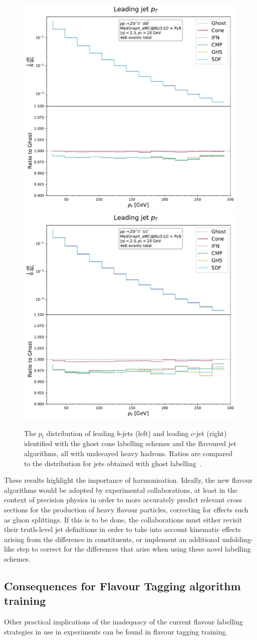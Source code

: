 \documentclass[10pt,a4paper]{book}
\begin{document}
\begin{figure}
    \centering
    \includegraphics[width=0.485\linewidth]{ftag/leadJetPt_undecayed_b.pdf}
    \includegraphics[width=0.485\linewidth]{ftag/leadJetPt_undecayed_c.pdf}
    \caption{The $p_t$ distribution of leading 
    $b$-jets (left) and leading $c$-jet (right) identified with
the ghost cone labelling schemes and the flavoured jet algorithms, all with undecayed heavy hadrons. Ratios are compared to the distribution for jets obtained with ghost labelling~\cite{Behring:2025ilo}.}
    \label{fig:undecay}
\end{figure}

These results highlight the importance of harmonisation. Ideally, the new flavour algorithms would be adopted by experimental collaborations, at least in the context of precision physics in order to more accurately predict relevant cross sections for the production of heavy flavour particles, correcting for effects such as gluon splittings. If this is to be done, the collaborations must either revisit their truth-level jet definitions in order to take into account kinematic effects arising from the difference in constituents, or implement an additional unfolding-like step to correct for the differences that arise when using these novel labelling schemes. 

\subsection{Consequences for Flavour Tagging algorithm training}
Other practical implications of the inadequacy of the current flavour labelling strategies in use in experiments can be found in flavour tagging training. 
\end{document}
